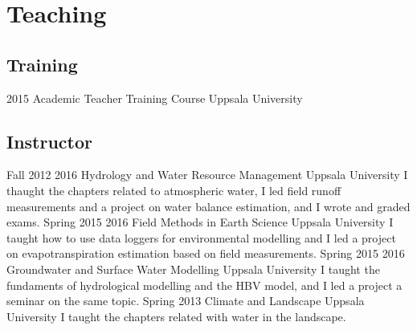 \section{Teaching}
    \subsection{Training}
        \shortposition
            {2015}
            {Academic Teacher Training Course}
            {Uppsala University}
    \subsection{Instructor}
        \position
            {Fall 2012 \textemdash{} 2016}
            {Hydrology and Water Resource Management}
            {Uppsala University}
            {I thaught the chapters related to atmospheric water, I led field runoff measurements and a project on water balance estimation, and I wrote and graded exams.}
        \position
            {Spring 2015 \textemdash{} 2016}
            {Field Methods in Earth Science}
            {Uppsala University}
            {I taught how to use data loggers for environmental modelling and I led a project on evapotranspiration estimation based on field measurements.}
        \position
            {Spring 2015 \textemdash{} 2016}
            {Groundwater and Surface Water Modelling}
            {Uppsala University}
            {I taught the fundaments of hydrological modelling and the HBV model, and I led a project a seminar on the same topic.}
        \position
            {Spring 2013}
            {Climate and Landscape}
            {Uppsala University}
            {I taught the chapters related with water in the landscape.}
